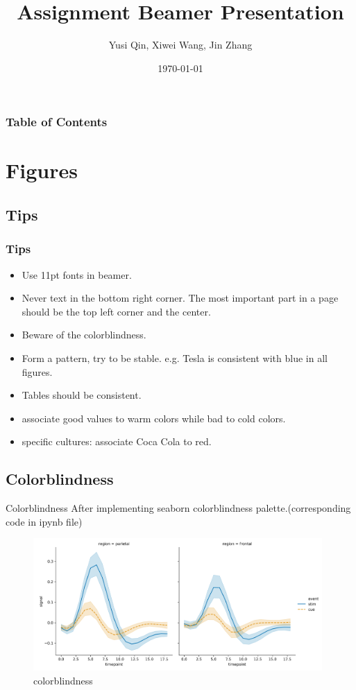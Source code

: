 \documentclass[11pt]{beamer}
\title{Assignment Beamer Presentation}
\author{Yusi Qin, Xiwei Wang, Jin Zhang}
\institute{University of Zurich}
\date{\today}
\begin{document}
\frame{\titlepage}

\begin{frame}
\frametitle{Table of Contents}
\tableofcontents
\end{frame}

\section{Figures}

\subsection{Tips}
\begin{frame}
\frametitle{Tips}
\begin{itemize}
    \item Use 11pt fonts in beamer.
    \item Never text in the bottom right corner. The most important part in a page should be the top left corner and the center. 
    \item Beware of the colorblindness.
    \item Form a pattern, try to be stable. e.g. Tesla is consistent with blue in all figures. 
    \item Tables should be consistent.
    \item associate good values to warm colors while bad to cold colors.
    \item specific cultures: associate Coca Cola to red.
\end{itemize}
\end{frame}

\subsection{Colorblindness}
\begin{frame}{Colorblindness}
After implementing seaborn colorblindness palette.(corresponding code in ipynb file)
\begin{figure}[htbp]
        \centering
        \includegraphics[width = 11cm]{colorblind.png}
        \caption{colorblindness}
        \label{fig:blind}
    \end{figure}
\end{frame}
\end{document}

